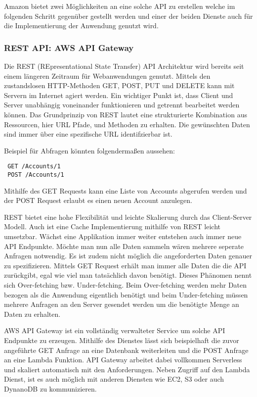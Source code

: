 Amazon bietet zwei Möglichkeiten an eine solche API zu erstellen welche im folgenden Schritt gegenüber gestellt werden und
einer der beiden Dienste auch für die Implementierung der Anwendung genutzt wird.


\subsubsection{REST API: AWS API Gateway}
Die REST (REpresentational State Transfer) API Architektur wird bereits seit einem längeren Zeitraum für Webanwendungen genutzt.
Mittels den zustandslosen HTTP-Methoden GET, POST, PUT und DELETE kann mit Servern im Internet agiert werden. Ein wichtiger Punkt ist, dass
Client und Server unabhängig voneinander funktionieren und getrennt bearbeitet werden können.
Das Grundprinzip von REST lautet eine strukturierte Kombination aus Ressourcen, hier URL Pfade, und Methoden zu erhalten.
Die gewünschten Daten sind immer über eine spezifische URL identifzierbar ist.

Beispiel für Abfragen könnten folgendermaßen aussehen:
\begin{lstlisting}
 GET /Accounts/1
 POST /Accounts/1
\end{lstlisting}

Mithilfe des GET Requests kann eine Liste von Accounts abgerufen werden und der POST Request erlaubt es einen neuen Account anzulegen.

REST bietet eine hohe Flexibilität und leichte Skalierung durch das Client-Server Modell. Auch ist eine Cache Implementierung mithilfe von REST leicht
umsetzbar. Wächst eine Applikation immer weiter entstehen auch immer neue API Endpunkte. Möchte man nun alle Daten sammeln wären mehrere seperate
Anfragen notwendig. Es ist zudem nicht möglich die angeforderten Daten genauer zu spezifizieren. Mittels GET Request erhält man immer alle Daten die
die API zurückgibt, egal wie viel man tatsächlich davon benötigt. Dieses Phänomen nennt sich Over-fetching bzw. Under-fetching.
Beim Over-fetching werden mehr Daten bezogen als die Anwendung eigentlich benötigt und beim Under-fetching müssen mehrere Anfragen an den Server
gesendet werden um die benötigte Menge an Daten zu erhalten.\cite[]{API}

AWS API Gateway ist ein vollständig verwalteter Service um solche API Endpunkte zu erzeugen.
Mithilfe des Dienstes lässt sich beispielhaft die zuvor angeführte GET Anfrage an eine Datenbank weiterleiten und die POST Anfrage an eine Lambda Funktion.
API Gateway arbeitet dabei vollkommen Serverless und skaliert automatisch mit den Anforderungen. Neben Zugriff auf den Lambda Dienst, ist es auch möglich
mit anderen Diensten wie EC2, S3 oder auch DynanoDB zu kommunizieren.

